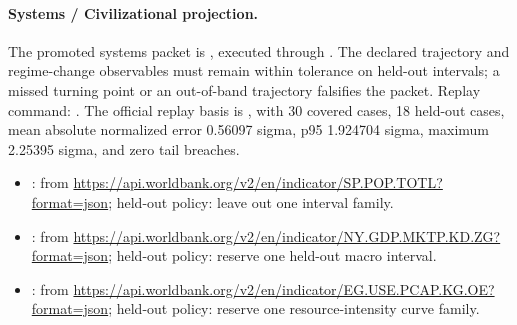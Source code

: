 \paragraph{Systems / Civilizational projection.}
The promoted systems packet is
, executed through
. The
declared trajectory and regime-change observables must remain within tolerance
on held-out intervals; a missed turning point or an out-of-band trajectory
falsifies the packet. Replay command:
.
The official replay basis is , with 30
covered cases, 18 held-out cases, mean absolute normalized error 0.56097
sigma, p95 1.924704 sigma, maximum 2.25395 sigma, and zero tail breaches.
\begin{itemize}[leftmargin=1.5em,nosep]
\item {}:  from \url{https://api.worldbank.org/v2/en/indicator/SP.POP.TOTL?format=json}; held-out policy: leave out one interval family.
\item {}:  from \url{https://api.worldbank.org/v2/en/indicator/NY.GDP.MKTP.KD.ZG?format=json}; held-out policy: reserve one held-out macro interval.
\item {}:  from \url{https://api.worldbank.org/v2/en/indicator/EG.USE.PCAP.KG.OE?format=json}; held-out policy: reserve one resource-intensity curve family.
\end{itemize}

\endgroup
